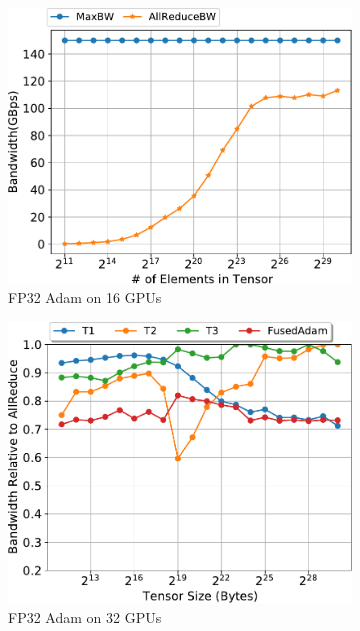 \begin{figure}
  \begin{subfigure}{0.66\columnwidth}
    \includegraphics[width=\columnwidth]{figures/results-adam-16-gpus.pdf}  
    \caption{FP32 Adam on 16 GPUs}
  \end{subfigure}
  \begin{subfigure}{0.66\columnwidth}
    \includegraphics[width=\columnwidth]{figures/results-adam-32-gpus.pdf}  
    \caption{FP32 Adam on 32 GPUs}
  \end{subfigure}
  \begin{subfigure}{0.66\columnwidth}

\end{subfigure}
\end{figure}
